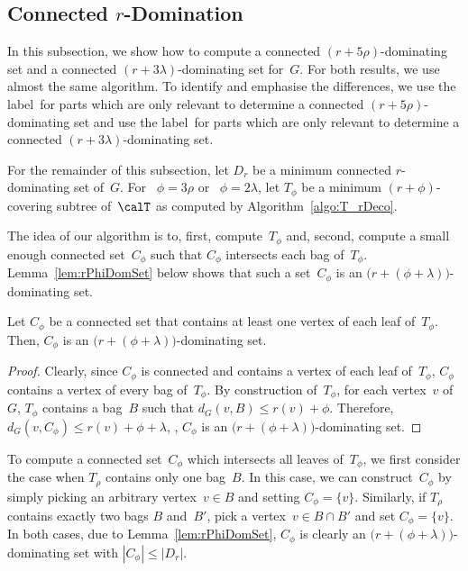\subsection{Connected $r$-Domination}

In this subsection, we show how to compute a connected $(r + 5 \rho)$-dominating set and a connected $(r + 3 \lambda)$-dominating set for~$G$.
For both results, we use almost the same algorithm.
To identify and emphasise the differences, we use the label~\rHrt for parts which are only relevant to determine a connected $(r + 5 \rho)$-dominating set and use the label~\rDmd for parts which are only relevant to determine a connected $(r + 3 \lambda)$-dominating set.

For the remainder of this subsection, let $D_r$ be a minimum connected $r$-dominating set of~$G$.
For \rHrt~$\phi = 3 \rho$ or \rDmd~$\phi = 2 \lambda$, let $T_\phi$ be a minimum $(r + \phi)$-covering subtree of~$\calT$ as computed by Algorithm~\ref{algo:T_rDeco}.

The idea of our algorithm is to, first, compute~$T_\phi$ and, second, compute a small enough connected set~$C_\phi$ such that $C_\phi$ intersects each bag of~$T_\phi$.
Lemma~\ref{lem:rPhiDomSet} below shows that such a set~$C_\phi$ is an $\big( r + (\phi + \lambda) \big)$-dominating set.

\begin{lemma}
    \label{lem:rPhiDomSet}
Let \( C_\phi \) be a connected set that contains at least one vertex of each leaf of~\( T_\phi \).
Then, \( C_\phi \) is an \( \big( r + (\phi + \lambda) \big) \)-dominating set.
\end{lemma}

\begin{proof}
Clearly, since $C_\phi$ is connected and contains a vertex of each leaf of~$T_\phi$, $C_\phi$ contains a vertex of every bag of~$T_\phi$.
By construction of~$T_\phi$, for each vertex~$v$ of~$G$, $T_\phi$ contains a bag~$B$ such that $d_G(v, B) \leq r(v) + \phi$.
Therefore, $d_G(v, C_\phi) \leq r(v) + \phi + \lambda$, \ie, $C_\phi$ is an $\big( r + (\phi + \lambda) \big)$-dominating set.
\end{proof}

To compute a connected set~$C_\phi$ which intersects all leaves of~$T_\phi$, we first consider the case when $T_\rho$ contains only one bag~$B$.
In this case, we can construct~$C_\phi$ by simply picking an arbitrary vertex~$v \in B$ and setting $C_\phi = \{ v \}$.
Similarly, if $T_\rho$ contains exactly two bags $B$ and~$B'$, pick a vertex~$v \in B \cap B'$ and set $C_\phi = \{ v \}$.
In both cases, due to Lemma~\ref{lem:rPhiDomSet}, $C_\phi$ is clearly an $\big( r + (\phi + \lambda) \big)$-dominating set with $|C_\phi| \leq |D_r|$.

